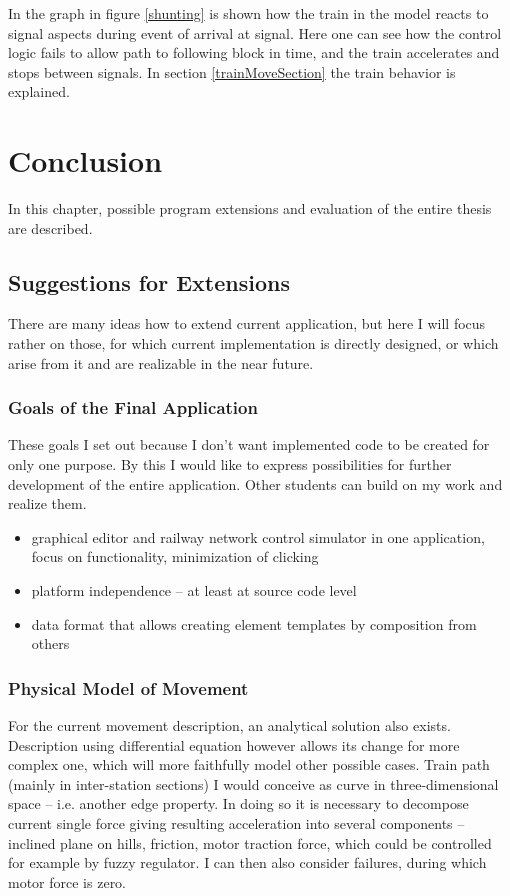 \documentclass[english]{cls/fitthesis}
\begin{document}
      In the graph in figure \ref{shunting} is shown how the train in the model reacts to signal aspects
      during event of arrival at signal.
      Here one can see how the control logic fails to allow path to following block in time,
      and the train accelerates and stops between signals.
      In section \ref{trainMoveSection} the train behavior is explained.

\chapter{Conclusion}
In this chapter, possible program extensions and evaluation of the entire thesis are described.
\section{Suggestions for Extensions}\label{chapExtensions}
There are many ideas how to extend current application, but here I will focus rather on those, for which
current implementation is directly designed, or which arise from it and are realizable in the near future.

  \subsection*{Goals of the Final Application}
    These goals I set out because I don't want implemented code to be created for only one purpose.
    By this I would like to express possibilities for further development of the entire application.
    Other students can build on my work and realize them.
    \begin{itemize}
        \item graphical editor and railway network control simulator in one application,
              focus on functionality, minimization of clicking
 	\item platform independence -- at least at source code level
 	\item data format that allows creating element templates by composition from others
    \end{itemize}

  \subsection*{Physical Model of Movement}
    For the current movement description, an analytical solution also exists. Description using differential equation
    however allows its change for more complex one, which will more faithfully model other possible cases.
    Train path (mainly in inter-station sections) I would conceive as curve
    in three-dimensional space -- i.e. another edge property.
    In doing so it is necessary to decompose current single force giving resulting acceleration into several components
    -- inclined plane on hills, friction, motor traction force, which could be controlled for example by fuzzy
    regulator. I can then also consider failures, during which motor force is zero.
\end{document}
